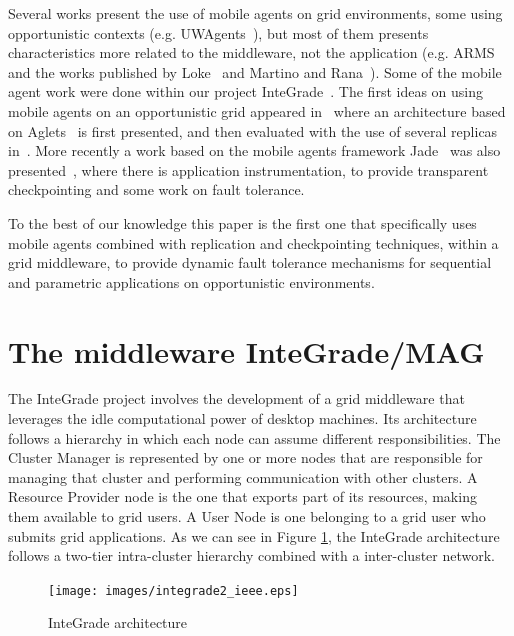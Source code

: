 \documentclass{sig-alternate}
\begin{document}
Several works present the use of mobile agents on grid environments, some using
opportunistic contexts (e.g. UWAgents~\cite{fukuda06}), but most of them
presents characteristics more related to the middleware, not the application
(e.g. ARMS~\cite{cao02} and the works published by Loke~\cite{loke03} and
Martino and Rana~\cite{martino04}). Some of the mobile agent work were done
within our project InteGrade~\cite{goldchleger04}. The first ideas on using
mobile agents on an opportunistic grid appeared in~\cite{barbosa04} where an
architecture based on Aglets~\cite{aglets} is first presented, and then
evaluated with the use of several replicas in~\cite{barbosa05}. More recently a
work based on the mobile agents framework Jade~\cite{jade} was also
presented~\cite{lopes05,lopes06_2}, where there is application instrumentation,
to provide transparent checkpointing and some work on fault tolerance.

To the best of our knowledge this paper is the first one that specifically uses
mobile agents combined with replication and checkpointing techniques, within a
grid middleware, to provide dynamic fault tolerance mechanisms for sequential
and parametric applications on opportunistic environments.


\section{The middleware InteGrade/MAG}\label{sec:arch}

The InteGrade project involves the development of a grid middleware that
leverages the idle computational power of desktop machines. 
Its architecture follows a hierarchy in which each node can assume
different responsibilities. The Cluster Manager is represented by one or more
nodes that are responsible for managing that cluster and performing
communication with other clusters. A Resource Provider node is the one that
exports part of its resources, making them available to grid users. A User Node
is one belonging to a grid user who submits grid applications. As we can see in
Figure \ref{fig:integrade}, the InteGrade architecture follows a two-tier
intra-cluster hierarchy combined with a inter-cluster network.

\begin{figure}[th]
\centering \texttt{[image: images/integrade2\_ieee.eps]}
\caption{InteGrade architecture}
\label{fig:integrade}
\end{figure}
\end{document}
